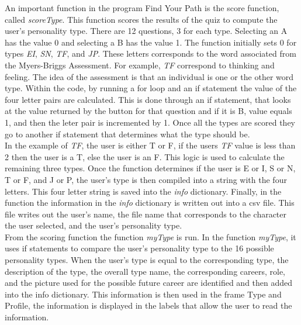 \documentclass[11pt]{article}%
\begin{document}
\indent An important function in the program Find Your Path is the score function, called \textit{scoreType}. This function scores the results of the quiz to compute the user’s personality type. There are 12 questions, 3 for each type. Selecting an A has the value 0 and selecting a B has the value 1. The function initially sets 0 for types \textit{EI}, \textit{SN}, \textit{TF}, and \textit{JP}. These letters corresponds to the word associated from the Myers-Briggs Assessment. For example, \textit{TF} correspond to thinking and feeling. The idea of the assessment is that an individual is one or the other word type. Within the code, by running a for loop and an if statement the value of the four letter pairs are calculated. This is done through an if statement, that looks at the value returned by the button for that question and if it is B, value equals 1, and then the leter pair is incremented by 1. Once all the types are scored they go to another if statement that determines what the type should be. \\
\indent In the example of \textit{TF}, the user is either T or F, if the users \textit{TF} value is less than 2 then the user is a T, else the user is an F. This logic is used to calculate the remaining three types. Once the function determines if the user is E or I, S or N, T or F, and J or P, the user’s type is then compiled into a string with the four letters. This four letter string is saved into the \textit{info} dictionary. Finally, in the function the information in the \textit{info} dictionary is written out into a csv file. This file writes out the user’s name, the file name that corresponds to the character the user selected, and the user’s personality type.\\
\indent From the scoring function the function \textit{myType} is run. In the function \textit{myType}, it uses if statements to compare the user’s personality type to the 16 possible personality types. When the user’s type is equal to the corresponding type, the description of the type, the overall type name, the corresponding careers, role, and the picture used for the possible future career are identified and then added into the info dictionary. This information is then used in the frame Type and Profile, the information is displayed in the labels that allow the user to read the information.\\
\end{document}
